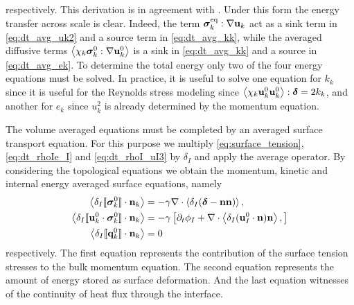 respectively. 
This derivation is in agreement with \citet{morel2015mathematical}. 
Under this form the energy transfer across scale is clear. 
Indeed, the term $\bm{\sigma}_k^\text{eq} : \mathbf{\nabla} \textbf{u}_k$ act as a sink term in \ref{eq:dt_avg_uk2} and a source term in \ref{eq:dt_avg_kk}, while the averaged diffusive terms $\left<\chi_k\bm{\sigma}_k^0 : \mathbf{\nabla} \textbf{u}_k^0\right>$ is a sink in \ref{eq:dt_avg_kk} and a source in \ref{eq:dt_avg_ek}. 
To determine the total energy only two of the four energy equations must be solved. 
In practice, it is useful to solve one equation for $k_k$ since it is useful for the Reynolds stress modeling since $\left<\chi_k \textbf{u}_k^0 \textbf{u}_k^0\right>: \bm\delta = 2 k_k$, and another for $e_k$ since $u_k^2$ is already determined by the momentum equation. 

The volume averaged equations must be completed by an averaged surface transport equation.  
For this purpose we multiply \ref{eq:surface_tension}, \ref{eq:dt_rhoIe_I} and \ref{eq:dt_rhoI_uI3} by $\delta_I$ and apply the average operator.
By considering the topological equations we obtain the  momentum, kinetic and internal energy averaged surface equations, namely
\begin{align}
    \label{eq:dt_avg_uI}
    \left<\delta_I \llbracket \bm{\sigma}^0_k \rrbracket \cdot \textbf{n}_k\right>
    &= -\gamma \mathbf{\nabla}\cdot \left<\delta_I (\bm\delta - \textbf{nn})\right>,\\
    \label{eq:dt_avg_gamma}
    \left<\delta_I \llbracket \textbf{u}_k^0 \cdot \bm{\sigma}^0_k \rrbracket \cdot \textbf{n}_k\right>
    &= - \gamma \left[
        \partial_t \phi_I
        +  \mathbf{\nabla}\cdot \left<\delta_I (\textbf{u}_{I}^0 \cdot \textbf{n})\textbf{n} \right>,
    \right]\\
    \left<\delta_I \llbracket \textbf{q}^0_k \rrbracket \cdot \textbf{n}_k\right>
    &= 0
\end{align}
respectively. 
The first equation represents the contribution of the surface tension stresses to the bulk momentum equation.
The second equation represents the amount of energy stored as surface deformation.
And the last equation witnesses of the continuity of heat flux through the interface. 
